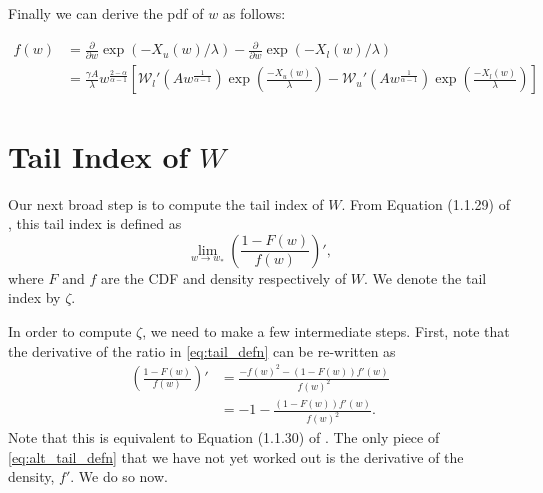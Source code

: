 \documentclass{article}
\newcommand{\sW}{\mathscr{W}}
\begin{document}
Finally we can derive the pdf of $w$ as follows: 

\begin{align}
f(w) &= \frac{\partial}{\partial w} \exp(-X_u(w)/ \lambda) - \frac{\partial}{\partial w} \exp(-X_l(w)/\lambda) \\
&= \frac{\gamma A }{\lambda} w^{\frac{2-\alpha}{\alpha-1}} \left[ \sW_l'(A w^{ \frac{1}{\alpha-1} }) \exp\left(\frac{-X_{u}(w)}{\lambda}\right) - \sW_u'(A w^{ \frac{1}{\alpha-1} }) \exp\left(\frac{-X_{l}(w)}{\lambda}\right) \right]
\end{align}

\section{Tail Index of $W$}


Our next broad step is to compute the tail index of $W$. From Equation (1.1.29) of \citet{deH06}, this tail index is defined as
%
\begin{equation}
    \lim_{w \rightarrow w_*} \left( \frac{1 - F(w)}{f(w)} \right)', \label{eq:tail_defn}
\end{equation}
%
where $F$ and $f$ are the CDF and density respectively of $W$. We denote the tail index by $\zeta$.

In order to compute $\zeta$, we need to make a few intermediate steps. First, note that the derivative of the ratio in \eqref{eq:tail_defn} can be re-written as
%
\begin{align}
    \left( \frac{1 - F(w)}{f(w)} \right)' &= \frac{-f(w)^2 - (1 - F(w)) f'(w)}{f(w)^2}\\
    &= -1 - \frac{(1 - F(w)) f'(w)}{f(w)^2}. \label{eq:alt_tail_defn}
\end{align}
%
Note that this is equivalent to Equation (1.1.30) of \citet{deH06}. The only piece of \eqref{eq:alt_tail_defn} that we have not yet worked out is the derivative of the density, $f'$. We do so now.
\end{document}
